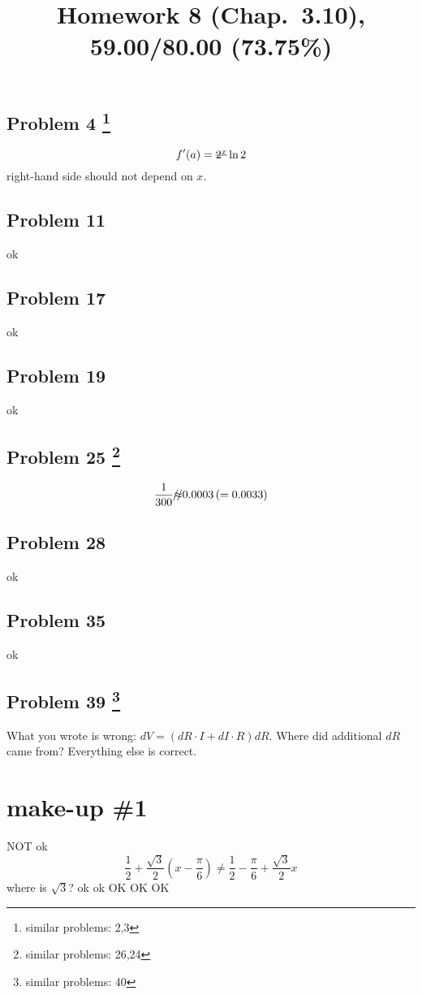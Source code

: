 \documentclass[10pt]{article} %
\title{Homework 8 (Chap.~3.10),
59.00/80.00 (73.75\%)
}
\begin{document}
\maketitle

\subsection*{Problem 4 \footnote{similar problems: 2,3}}
\begin{equation*}
  f'(a)=\mbox{\sout{$2^x$}}\ln 2
\end{equation*}
right-hand side should not depend on $x$.
\subsection*{Problem 11 }
ok
\subsection*{Problem 17 }
ok
\subsection*{Problem 19 }
ok
\subsection*{Problem 25 \footnote{similar problems: 26,24}}
\begin{equation*}
  \frac{1}{300}\mbox{\xout{$\approx$}} 0.0003\left( =0.0033 \right)
\end{equation*}
\subsection*{Problem 28 }
ok
\subsection*{Problem 35 }
ok
\subsection*{Problem 39  \footnote{similar problems: 40}}
What you wrote is wrong: \sout{$dV=\left( dR\cdot I+dI\cdot R \right)dR$}.
Where did additional $dR$ came from? Everything else is correct.
\section*{make-up \#1}
NOT ok
\begin{equation*}
	\frac{1}{2}+\frac{\sqrt{3}}{2}\left( x-\frac{\pi}{6} \right)\neq\frac{1}{2}-\frac{\pi}{6}
	+\frac{\sqrt{3}}{2}x
\end{equation*}
where is $\sqrt{3}$?
ok
ok
OK
OK
OK
\end{document}
